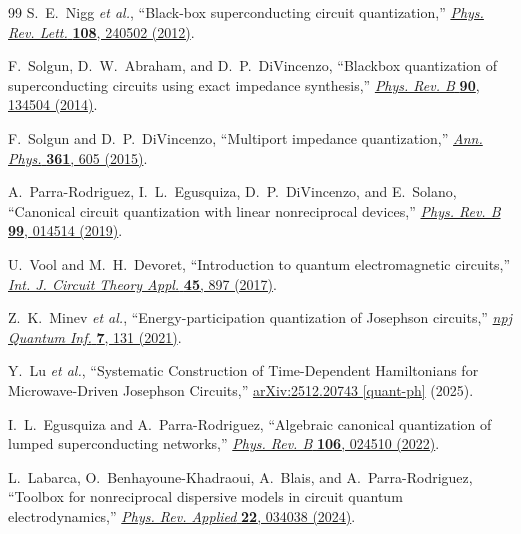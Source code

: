 \documentclass[reprint, floatfix, superscriptaddress, amsmath, amssymb, longbibliography]{revtex4-2}
\begin{document}
\begin{thebibliography}{99}
S.~E.~Nigg \textit{et al.}, ``Black-box superconducting circuit quantization,'' 
\href{https://doi.org/10.1103/PhysRevLett.108.240502}{\textit{Phys. Rev. Lett.} \textbf{108}, 240502 (2012)}.

F.~Solgun, D.~W.~Abraham, and D.~P.~DiVincenzo, ``Blackbox quantization of superconducting circuits using exact impedance synthesis,'' 
\href{https://doi.org/10.1103/PhysRevB.90.134504}{\textit{Phys. Rev. B} \textbf{90}, 134504 (2014)}.

F.~Solgun and D.~P.~DiVincenzo, ``Multiport impedance quantization,'' 
\href{https://doi.org/10.1016/j.aop.2015.07.005}{\textit{Ann. Phys.} \textbf{361}, 605 (2015)}.

A.~Parra-Rodriguez, I.~L.~Egusquiza, D.~P.~DiVincenzo, and E.~Solano, ``Canonical circuit quantization with linear nonreciprocal devices,'' 
\href{https://doi.org/10.1103/PhysRevB.99.014514}{\textit{Phys. Rev. B} \textbf{99}, 014514 (2019)}.

U.~Vool and M.~H.~Devoret, ``Introduction to quantum electromagnetic circuits,'' 
\href{https://doi.org/10.1002/cta.2359}{\textit{Int. J. Circuit Theory Appl.} \textbf{45}, 897 (2017)}.

Z.~K.~Minev \textit{et al.}, ``Energy-participation quantization of Josephson circuits,'' 
\href{https://doi.org/10.1038/s41534-021-00461-8}{\textit{npj Quantum Inf.} \textbf{7}, 131 (2021)}.

Y.~Lu \textit{et al.},
``Systematic Construction of Time-Dependent Hamiltonians for Microwave-Driven Josephson Circuits,''
\href{https://arxiv.org/abs/2512.20743}{arXiv:2512.20743 [quant-ph]} (2025).

I.~L.~Egusquiza and A.~Parra-Rodriguez,
``Algebraic canonical quantization of lumped superconducting networks,''
\href{https://doi.org/10.1103/PhysRevB.106.024510}{\textit{Phys. Rev. B} \textbf{106}, 024510 (2022)}.

L.~Labarca, O.~Benhayoune-Khadraoui, A.~Blais, and A.~Parra-Rodriguez,
``Toolbox for nonreciprocal dispersive models in circuit quantum electrodynamics,''
\href{https://doi.org/10.1103/PhysRevApplied.22.034038}{\textit{Phys. Rev. Applied} \textbf{22}, 034038 (2024)}.


\end{thebibliography}
\end{document}
